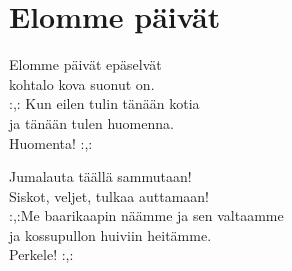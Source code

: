 \section{Elomme päivät}
\vspace{-0.3cm}
Elomme päivät epäselvät\\
kohtalo kova suonut on.\\
:,: Kun eilen tulin tänään kotia\\
ja tänään tulen huomenna. \\
Huomenta! :,:

Jumalauta täällä sammutaan!\\
Siskot, veljet, tulkaa auttamaan!\\
:,:Me baarikaapin näämme ja sen valtaamme\\
ja kossupullon huiviin heitämme.\\
Perkele! :,: